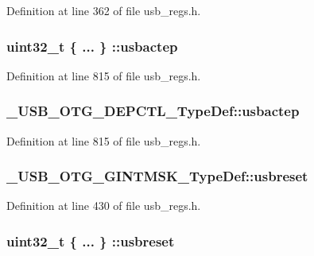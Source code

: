 Definition at line 362 of file usb\-\_\-regs.\-h.

\hypertarget{group___u_s_b___o_t_g___d_r_i_v_e_r_ga717cd452b99e432d6a890efba27cfd35}{
\subsubsection[{usbactep}]{\setlength{\rightskip}{0pt plus 5cm}uint32\-\_\-t \{ ... \} \-::usbactep}}\label{group___u_s_b___o_t_g___d_r_i_v_e_r_ga717cd452b99e432d6a890efba27cfd35}


Definition at line 815 of file usb\-\_\-regs.\-h.

\hypertarget{group___u_s_b___o_t_g___d_r_i_v_e_r_gab3805d715faba1f50520d202c9da5be0}{
\subsubsection[{usbactep}]{ \-\_\-\-U\-S\-B\-\_\-\-O\-T\-G\-\_\-\-D\-E\-P\-C\-T\-L\-\_\-\-Type\-Def\-::usbactep}}\label{group___u_s_b___o_t_g___d_r_i_v_e_r_gab3805d715faba1f50520d202c9da5be0}


Definition at line 815 of file usb\-\_\-regs.\-h.

\hypertarget{group___u_s_b___o_t_g___d_r_i_v_e_r_ga4ca380dede566ab5effaceb4ff0ef506}{
\subsubsection[{usbreset}]{ \-\_\-\-U\-S\-B\-\_\-\-O\-T\-G\-\_\-\-G\-I\-N\-T\-M\-S\-K\-\_\-\-Type\-Def\-::usbreset}}\label{group___u_s_b___o_t_g___d_r_i_v_e_r_ga4ca380dede566ab5effaceb4ff0ef506}


Definition at line 430 of file usb\-\_\-regs.\-h.

\hypertarget{group___u_s_b___o_t_g___d_r_i_v_e_r_gab8223c7d0a73b4ea86dad34b1ccbff3b}{
\subsubsection[{usbreset}]{\setlength{\rightskip}{0pt plus 5cm}uint32\-\_\-t \{ ... \} \-::usbreset}}\label{group___u_s_b___o_t_g___d_r_i_v_e_r_gab8223c7d0a73b4ea86dad34b1ccbff3b}


